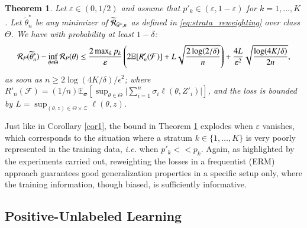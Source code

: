 \documentclass[12pt]{article}
\newtheorem{theorem}{{\bf Theorem}}
\newcommand{\cR}{{\cal R}}
\begin{document}
\begin{theorem}
  \label{th:excess_risk}
  Let $\varepsilon \in (0,1/2)$ and assume that $p'_k \in (\varepsilon, 1-\varepsilon)$ for $k=1, \ldots,K$. Let $\widetilde{\theta}^*_n$ be any minimizer of
  $\widetilde{\cR}_{\widehat{w}^*,n}$ as defined in \eqref{eq:strata_reweighting} over class $\Theta$. We
  have with probability at least $1- \delta$:
  \begin{equation*}
      \cR_P (\widetilde{\theta}^*_n) - \inf_{\theta\in \Theta}\cR_P(\theta)
      \leq \frac{2\max_k p_k }{\varepsilon}
      \left( 2  \mathbb{E}[R'_n(\mathcal{F})  ]  + L \sqrt{\frac{2\log(2/\delta)}{n}} \right)
+\frac{4 L}{\varepsilon^2} \sqrt{\frac{\log (4K/\delta)}{2n}},
\end{equation*}
  as soon as $n\geq 2\log(4K/\delta)/\epsilon^2$; where $R'_n(\mathcal{F})=(1/n)\mathbb{E}_{\mathbf{\sigma}}[\sup_{\theta\in \Theta}\vert \sum_{i=1}^n\sigma_i \ell(\theta, Z'_i) \vert]$, and the loss is bounded by $L=\sup_{(\theta, z) \in \Theta \times \mathcal{Z}} \ell(\theta, z)$.
\end{theorem}

Just like in Corollary \ref{cor1}, the bound in Theorem \ref{th:excess_risk} explodes when $\varepsilon$ vanishes, which corresponds to the situation where a stratum $k\in\{1,\dots,K\}$ is very poorly represented in the training data, \textit{i.e.} when $p'_k <<p_k$. Again, as highlighted by the experiments carried out, reweighting the losses in a frequentist (ERM) approach guarantees good generalization properties in a specific setup only, where the training information, though biased, is sufficiently informative.
 

\subsection{Positive-Unlabeled Learning}\label{subsec:pu}
\end{document}
